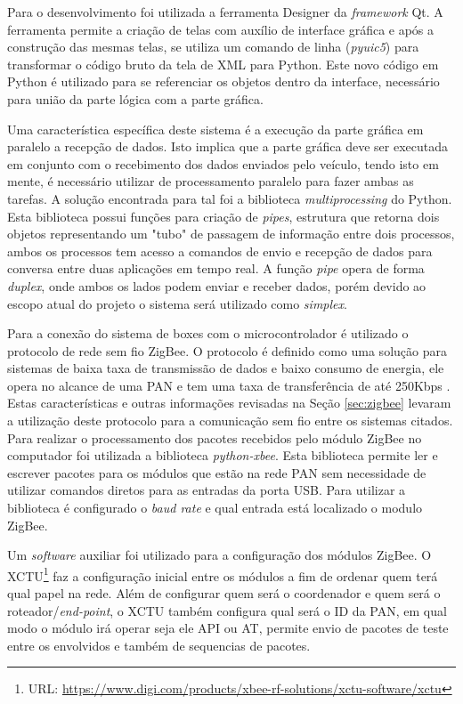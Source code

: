 Para o desenvolvimento foi utilizada a ferramenta Designer da \textit{framework} Qt. A ferramenta permite a criação de telas com auxílio de interface gráfica e após a construção das mesmas telas, se utiliza um comando de linha (\textit{pyuic5}) para transformar o código bruto da tela de XML para Python. Este novo código em Python é utilizado para se referenciar os objetos dentro da interface, necessário para união da parte lógica com a parte gráfica.

Uma característica específica deste sistema é a execução da parte gráfica em paralelo a recepção de dados. Isto implica que a parte gráfica deve ser executada em conjunto com o recebimento dos dados enviados pelo veículo, tendo isto em mente, é necessário utilizar de processamento paralelo para fazer ambas as tarefas. A solução encontrada para tal foi a biblioteca \textit{multiprocessing} do Python. Esta biblioteca possui funções para criação de \textit{pipes}, estrutura que retorna dois objetos representando um "tubo" de passagem de informação entre dois processos, ambos os processos tem acesso a comandos de envio e recepção de dados para conversa entre duas aplicações em tempo real. A função \textit{pipe} opera de forma \textit{duplex}, onde ambos os lados podem enviar e receber dados, porém devido ao escopo atual do projeto o sistema será utilizado como \textit{simplex}.    

Para a conexão do sistema de boxes com o microcontrolador é utilizado o protocolo de rede sem fio ZigBee. O protocolo é definido como uma solução para sistemas de baixa taxa de transmissão de dados e baixo consumo de energia, ele opera no alcance de uma PAN e tem uma taxa de transferência de até 250Kbps \cite{elahi2009zigbee}. Estas características e outras informações revisadas na Seção \ref{sec:zigbee} levaram a utilização deste protocolo para a comunicação sem fio entre os sistemas citados. Para realizar o processamento dos pacotes recebidos pelo módulo ZigBee no computador foi utilizada a biblioteca \textit{python-xbee}. Esta biblioteca permite ler e escrever pacotes para os módulos que estão na rede PAN sem necessidade de utilizar comandos diretos para as entradas da porta USB. Para utilizar a biblioteca é configurado o \textit{baud rate} e qual entrada está localizado o modulo ZigBee. 

Um \textit{software} auxiliar foi utilizado para a configuração dos módulos ZigBee. O XCTU\footnote[3]{URL: \url{https://www.digi.com/products/xbee-rf-solutions/xctu-software/xctu}} faz a configuração inicial entre os módulos a fim de ordenar quem terá qual papel na rede. Além de configurar quem será o coordenador e quem será o roteador/\textit{end-point}, o XCTU também configura qual será o ID da PAN, em qual modo o módulo irá operar seja ele API ou AT, permite envio de pacotes de teste entre os envolvidos e também de sequencias de pacotes. 

